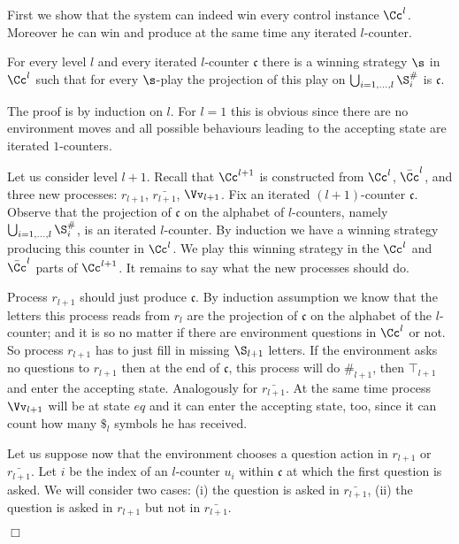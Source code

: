 \documentclass{llncs}
\newcommand{\rlp}{r_{l+1}}
\newcommand{\brlp}{\bar{\rlp}}
\newcommand{\cc}{\mathfrak{c}}
\renewenvironment{proof}{{\em Proof. }}{\nopagebreak
  \hspace*{\fill}$\Box$}
\begin{document}
First we show that the system can indeed win every control instance
$\Cc^l$. Moreover he can win and produce at the same time any iterated
$l$-counter.

\medskip

\begin{lemma}\label{lemma:strategy-exits}
  For every level $l$ and every iterated $l$-counter $\cc$ there is a
  winning strategy $\s$ in $\Cc^l$ such that for every $\s$-play
  the projection of this play on
  $\bigcup_{i=1,\ldots,l} \S^\#_i$ is $\cc$.
\end{lemma}

\medskip

\begin{proof}
  The proof is by induction on $l$. For $l=1$ this is obvious since
  there are no environment moves and all possible behaviours leading
  to the accepting state are iterated $1$-counters.

  Let us consider level $l+1$. Recall that $\Cc^{l+1}$ is constructed
  from $\Cc^l$, $\bar{\Cc}^l$, and three new processes: $\rlp$,
  $\brlp$, $\Vv_{l+1}$. Fix an iterated $(l+1)$-counter $\cc$. Observe that
  the projection of $\cc$ on the alphabet of $l$-counters, namely
  $\bigcup_{i=1,\dots,l} \S^\#_i$, is an iterated $l$-counter.  By
  induction we have a winning strategy producing this
  counter in $\Cc^l$. We play this winning strategy in the $\Cc^l$ and
  $\bar\Cc^l$ parts of $\Cc^{l+1}$. It remains to say what the new
  processes  should do.

  Process $r_{l+1}$ should just produce $\cc$. By induction assumption
  we know that the letters this process reads from $r_l$ are the
  projection of $\cc$ on the alphabet of the $l$-counter; and it is so no
  matter if there are environment questions in $\Cc^l$ or not. So
  process $\rlp$ has to just fill in missing $\S_{l+1}$ letters. If
  the environment asks no questions to $r_{l+1}$ then at the end of
  $\cc$, this process will do $\#_{l+1}$, then $\top_{l+1}$ and enter the accepting
  state. Analogously for $\bar{r_{l+1}}$. At the same time process $\Vv_{l+1}$
  will be at state $\mathit{eq}$ and it can enter the accepting state, too,
  since it can count how many $\$_l$ symbols he has received.

  Let us suppose now that the environment chooses a question action in
  $r_{l+1}$ or $\bar{r_{l+1}}$. Let $i$ be the index of an $l$-counter $u_i$
  within $\cc$ at which the first question is asked. We will consider
  two cases: (i) the question is asked in $\bar{r_{l+1}}$, (ii) the
  question is asked in $r_{l+1}$ but not in $\bar{r_{l+1}}$.


\end{proof}
\end{document}
